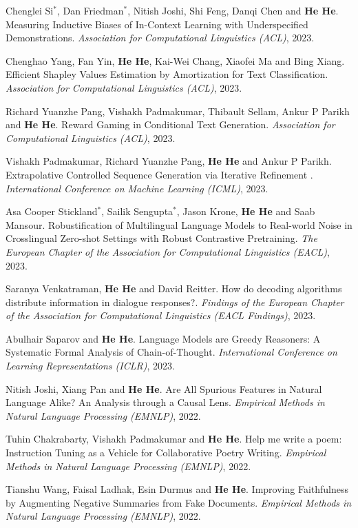Chenglei Si$^*$, Dan Friedman$^*$, Nitish Joshi, Shi Feng, Danqi Chen and \textbf{He He}. Measuring Inductive Biases of In-Context Learning with Underspecified Demonstrations. \textit{Association for Computational Linguistics (ACL)}, 2023.

Chenghao Yang, Fan Yin, \textbf{He He}, Kai-Wei Chang, Xiaofei Ma and Bing Xiang. Efficient Shapley Values Estimation by Amortization for Text Classification. \textit{Association for Computational Linguistics (ACL)}, 2023.

Richard Yuanzhe Pang, Vishakh Padmakumar, Thibault Sellam, Ankur P Parikh and \textbf{He He}. Reward Gaming in Conditional Text Generation. \textit{Association for Computational Linguistics (ACL)}, 2023.

Vishakh Padmakumar, Richard Yuanzhe Pang, \textbf{He He} and Ankur P Parikh. Extrapolative Controlled Sequence Generation via Iterative Refinement . \textit{International Conference on Machine Learning (ICML)}, 2023.

Asa Cooper Stickland$^*$, Sailik Sengupta$^*$, Jason Krone, \textbf{He He} and Saab Mansour. Robustification of Multilingual Language Models to Real-world Noise in Crosslingual Zero-shot Settings with Robust Contrastive Pretraining. \textit{The European Chapter of the Association for Computational Linguistics (EACL)}, 2023.

Saranya Venkatraman, \textbf{He He} and David Reitter. How do decoding algorithms distribute information in dialogue responses?. \textit{Findings of the European Chapter of the Association for Computational Linguistics (EACL Findings)}, 2023.

Abulhair Saparov and \textbf{He He}. Language Models are Greedy Reasoners: A Systematic Formal Analysis of Chain-of-Thought. \textit{International Conference on Learning Representations (ICLR)}, 2023.

Nitish Joshi, Xiang Pan and \textbf{He He}. Are All Spurious Features in Natural Language Alike? An Analysis through a Causal Lens. \textit{Empirical Methods in Natural Language Processing (EMNLP)}, 2022.

Tuhin Chakrabarty, Vishakh Padmakumar and \textbf{He He}. Help me write a poem: Instruction Tuning as a Vehicle for Collaborative Poetry Writing. \textit{Empirical Methods in Natural Language Processing (EMNLP)}, 2022.

Tianshu Wang, Faisal Ladhak, Esin Durmus and \textbf{He He}. Improving Faithfulness by Augmenting Negative Summaries from Fake Documents. \textit{Empirical Methods in Natural Language Processing (EMNLP)}, 2022.

